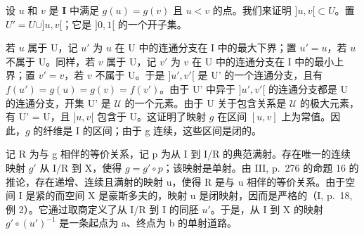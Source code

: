 设 \(u\) 和 \(v\) 是 \(\mathbf{I}\) 中满足 \(g(u) = g(v)\) 且 \(u < v\) 的点。我们来证明 \(]u, v[ \subset U\)。置 \(U' = U \cup ]u, v[\)；它是 \(]0, 1[\) 的一个开子集。

若 \(u\) 属于 U，记 \(u'\) 为 \(u\) 在 U 中的连通分支在 I 中的最大下界；置 \(u' = u\)，若 \(u\) 不属于 U。同样，若 \(v\) 属于 U，记 \(v'\) 为 \(v\) 在 U 中的连通分支在 I 中的最小上界；置 \(v' = v\)，若 \(v\) 不属于 U。于是 \(]u', v'[\) 是 U' 的一个连通分支，且有 \(f(u') = g(u) = g(v) = f(v')\)。由于 U' 中异于 \(]u', v'[\) 的连通分支都是 U 的连通分支，开集 U' 是 \(\mathcal{U}\) 的一个元素。由于 U 关于包含关系是 \(\mathcal{U}\) 的极大元素，有 U' = U，且 \(]u, v[\) 包含于 U。这证明了映射 \(g\) 在区间 \([u, v]\) 上为常值。因此，\(g\) 的纤维是 I 的区间；由于 g 连续，这些区间是闭的。

记 R 为与 g 相伴的等价关系，记 p 为从 I 到 I/R 的典范满射。存在唯一的连续映射 \(g'\) 从 I/R 到 X，使得 \(g = g' \circ p\)；该映射是单射。由 III, p.~276 的命题 16 的推论，存在递增、连续且满射的映射 u，使得 R 是与 u 相伴的等价关系。由于空间 I 是紧的而空间 X 是豪斯多夫的，映射 u 是闭映射，因而是严格的（I, p.~18, 例 2）。它通过取商定义了从 I/R 到 I 的同胚 \(u'\)。于是，从 I 到 X 的映射 \(g' \circ (u')^{-1}\) 是一条起点为 a、终点为 b 的单射道路。

